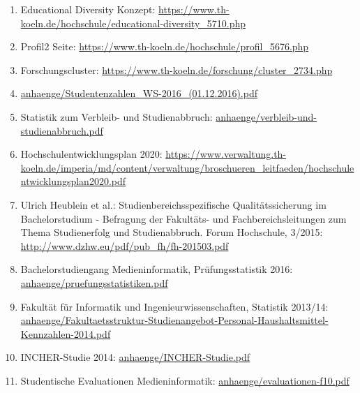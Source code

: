 \documentclass[BCOR12mm,DIV11,titlepage,a4paper,oneside,10pt]{scrbook}
\begin{document}
\begin{sloppypar}
\begin{flushleft}

\begin{enumerate}
\item{Educational Diversity Konzept: \href{https://www.th-koeln.de/hochschule/educational-diversity\_5710.php}{https://www.th-koeln.de/hochschule/educational-diversity\_5710.php} } 
\item{Profil2 Seite: \href{https://www.th-koeln.de/hochschule/profil\_5676.php}{https://www.th-koeln.de/hochschule/profil\_5676.php} } 
\item{Forschungscluster: \href{https://www.th-koeln.de/forschung/cluster\_2734.php}{https://www.th-koeln.de/forschung/cluster\_2734.php} } 
\item{\href{anhaenge/Studentenzahlen\_WS-2016\_(01.12.2016).pdf}{anhaenge/Studentenzahlen\_WS-2016\_(01.12.2016).pdf} } 
\item{Statistik zum Verbleib- und Studienabbruch: \href{anhaenge/verbleib-und-studienabbruch.pdf}{anhaenge/verbleib-und-studienabbruch.pdf} } 
\item{Hochschulentwicklungsplan 2020: \href{https://www.verwaltung.th-koeln.de/imperia/md/content/verwaltung/broschueren\_leitfaeden/hochschulentwicklungsplan2020.pdf}{https://www.verwaltung.th-koeln.de/imperia/md/content/verwaltung/broschueren\_leitfaeden/hochschulentwicklungsplan2020.pdf} } 
\item{Ulrich Heublein et al.: Studienbereichsspezifische Qualitätssicherung im Bachelorstudium - Befragung der Fakultäts- und Fachbereichsleitungen zum Thema Studienerfolg und Studienabbruch. Forum Hochschule, 3/2015: \href{http://www.dzhw.eu/pdf/pub\_fh/fh-201503.pdf}{http://www.dzhw.eu/pdf/pub\_fh/fh-201503.pdf} } 
\item{Bachelorstudiengang Medieninformatik, Prüfungsstatistik 2016: \href{anhaenge/pruefungsstatistiken.pdf}{anhaenge/pruefungsstatistiken.pdf} } 
\item{Fakultät für Informatik und Ingenieurwissenschaften, Statistik 2013/14: \href{anhaenge/Fakultaetsstruktur-Studienangebot-Personal-Haushaltsmittel-Kennzahlen-2014.pdf}{anhaenge/Fakultaetsstruktur-Studienangebot-Personal-Haushaltsmittel-Kennzahlen-2014.pdf} } 
\item{INCHER-Studie 2014: \href{anhaenge/INCHER-Studie.pdf}{anhaenge/INCHER-Studie.pdf} } 
\item{Studentische Evaluationen Medieninformatik: \href{anhaenge/evaluationen-f10.pdf}{anhaenge/evaluationen-f10.pdf} } 

\end{enumerate}
\end{flushleft}
\end{sloppypar}
\end{document}
